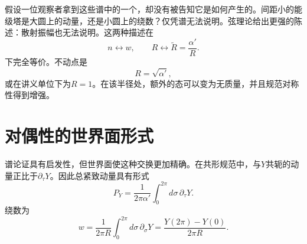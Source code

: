 假设一位观察者拿到这些谱中的一个，却没有被告知它是如何产生的。间距小的能级塔是大圆上的动量，还是小圆上的绕数？仅凭谱无法说明。弦理论给出更强的陈述：散射振幅也无法说明。这两种描述在
\begin{equation}
  n\longleftrightarrow w,
  \qquad
  R\longleftrightarrow \widetilde R=\frac{\alpha'}{R}.
  \label{eq:l10-radius-duality}
\end{equation}
下完全等价。不动点是
\begin{equation}
  R=\sqrt{\alpha'},
  \label{eq:l10-self-dual-radius}
\end{equation}
或在讲义单位下为\(R=1\)。在该半径处，额外的态可以变为无质量，并且规范对称性得到增强。

\begin{classroomqa}
\end{classroomqa}

\begin{classroomqa}
\end{classroomqa}

\section{对偶性的世界面形式}

谱论证具有启发性，但世界面使这种交换更加精确。在共形规范中，与\(Y\)共轭的动量正比于\(\partial_\tau Y\)。因此总紧致动量具有形式
\begin{equation}
  P_Y=\frac{1}{2\pi\alpha'}
      \int_0^{2\pi}d\sigma\,\partial_\tau Y.
  \label{eq:l10-worldsheet-momentum}
\end{equation}
绕数为
\begin{equation}
  w=\frac{1}{2\pi R}
      \int_0^{2\pi}d\sigma\,\partial_\sigma Y
   =\frac{Y(2\pi)-Y(0)}{2\pi R}.
  \label{eq:l10-worldsheet-winding}
\end{equation}

\begin{classroomqa}
\end{classroomqa}

